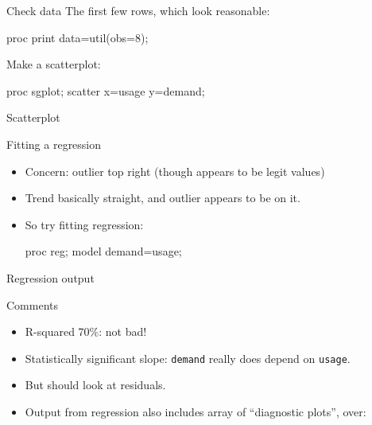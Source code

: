 \documentclass[unknownkeysallowed]{beamer}\usepackage[]{graphicx}\usepackage[]{color}
\begin{document}
\begin{frame}[fragile]{Check data}
  The first few rows, which look reasonable:

  \begin{Sascode}[store=ca]
proc print data=util(obs=8);    
  \end{Sascode}
  

Make a scatterplot:

    \begin{Sascode}[store=dda]
proc sgplot;
  scatter x=usage y=demand;
    \end{Sascode}

  
\end{frame}

\begin{frame}[fragile]{Scatterplot}


\end{frame}

\begin{frame}[fragile]{Fitting a regression}

  \begin{itemize}
  \item Concern: outlier top right (though appears to be legit values)
  \item Trend basically straight, and outlier appears to be on it.
  \item So try fitting regression:

    \begin{Sascode}[store=ddb]
proc reg;
  model demand=usage;      
    \end{Sascode}
    

  \end{itemize}
  
\end{frame}


\begin{frame}[fragile]{Regression output}



\end{frame}

\begin{frame}[fragile]{Comments}

  \begin{itemize}
  \item R-squared 70\%: not bad!
  \item Statistically significant slope: \texttt{demand} really does
    depend on \texttt{usage}.
  \item But should look at residuals.
  \item Output from regression also includes array of ``diagnostic
    plots'', over:

  \end{itemize}

\end{frame}
\end{document}

